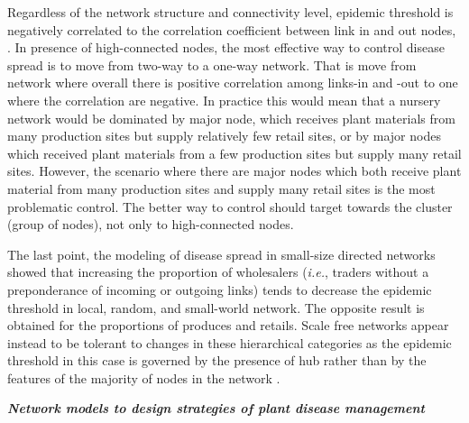 \documentclass[12pt, oneside]{report}
\begin{document}

Regardless of the network structure and connectivity level, epidemic threshold is negatively correlated to the correlation coefficient between link in and out nodes, \citep{Moslonka2008}. In presence of high-connected nodes, the most effective way to control disease spread is to move from two-way to a one-way network. That is move from network where overall there is positive correlation among links-in and -out to one where the correlation are negative. In practice this would mean that a nursery network would be dominated by major node, which receives plant materials from many production sites but supply relatively few retail sites, or by major nodes which received plant materials from a few production sites but supply many retail sites. However, the scenario where there are major nodes which both receive plant material from many production sites and supply many retail sites is the most problematic control. The better way to control should target towards the cluster (group of nodes), not only to high-connected nodes. 

The last point, the modeling of disease spread in small-size directed networks showed that increasing the proportion of wholesalers (\textit{i.e.}, traders without a preponderance of incoming or outgoing links) tends to decrease the epidemic threshold in local, random, and small-world network. The opposite result is obtained for the proportions of produces and retails. Scale free networks appear instead to be tolerant to changes in these hierarchical categories as the epidemic threshold in this case is governed by the presence of hub rather than by the features of the majority of nodes in the network \citep{Moslonka2010}.

\textit{\textbf{Network models to design strategies of plant disease management}}
\end{document}
